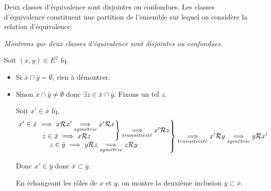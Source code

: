 \documentclass{article}
\date{29 novembre 2023}
\begin{document}
	
	\maketitle
	
	\begin{question_kholle}
		[\noindent Soit \Rel une relation d'équivalence sur $E$. \\
		Soit $x \in E$. \\
		La classe de $x$, notée $\bar{x}$, est l'ensemble des éléments de $E$ en relation avec x.
		\begin{equation}
			\bar{x} = \left\{ y \in E \;|\; x \Rel y \right\}
		\end{equation}]
		{Deux classes d'équivalence sont disjointes ou confondues. Les classes d'équivalence constituent une partition de l'ensemble sur lequel on considère la relation d'équivalence.}
		
		\textit{Montrons que deux classes d'équivalence sont disjointes ou confondues.}
		
		Soit $(x, y) \in E^2$ fq.
		\begin{itemize}[label=\textemdash]
			\item Si $\bar{x} \cap \bar{y} = \emptyset$, rien à démontrer.
			\item Sinon $\bar{x} \cap \bar{y} \neq \emptyset$ donc $\exists z \in \bar{x} \cap \bar{y}$. Fixons un tel $z$.

			Soit $x' \in \bar{x}$ fq.
			\begin{equation*}
				\left.
				\begin{matrix}
					\left. \begin{matrix}
						x' \in \bar{x} \implies x \mathcal R x' \underset{sym\acute{e}trie}{\implies} x' \mathcal R x \\
						z \in \bar{x} \implies x \mathcal R z
					\end{matrix}
					\right\} \underset{transitivit\acute{e}}{\implies} x' \mathcal R z \\
					z \in \bar{y} \implies y \mathcal R z \underset{sym\acute{e}trie}{\implies} z \mathcal R y
				\end{matrix}
				\right\} \underset{transitivit\acute{e}}{\implies} x' \mathcal R y
				\underset{sym\acute{e}trie}{\implies} y \mathcal R x'
			\end{equation*}
			
			Donc $x' \in \bar{y}$ donc $\bar{x} \subset \bar{y}$.
			
			En échangeant les rôles de $x$ et $y$, on montre la deuxième inclusion $\bar{y} \subset \bar{x}$.
		\end{itemize}
		\bigbreak
	

\end{question_kholle}
\end{document}
